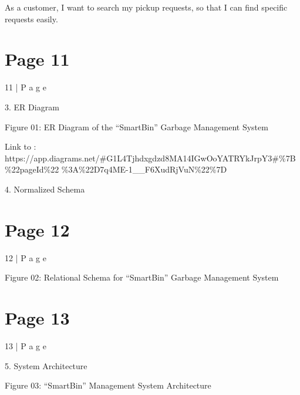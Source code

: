 \documentclass{article}
\begin{document}
As a customer, I want to search my pickup requests, so that I can 
find specific requests easily.  
 
 
 
 
 
 
 
 
 
 
 
 
 
 
 
 
 
 
 
 
 

\section*{Page 11}
11 | P a g e 
 
3. ER Diagram 
 
  Figure 01: ER Diagram of the “SmartBin” Garbage Management System 
 
 
 
Link to : 
https://app.diagrams.net/\#G1L4Tjhdxgdzd8MA14IGwOoYATRYkJrpY3\#\%7B\%22pageId\%22
\%3A\%22D7q4ME-1\_\_F6XudRjVuN\%22\%7D 
 
 
 
 
4. Normalized Schema 
 
 


\section*{Page 12}
12 | P a g e 
 
 
 
 
 
 
 
 
 
 
 
 
 
 
 
 
 
 
 
 
 
 
 
 
 
  Figure 02: Relational Schema for “SmartBin” Garbage Management System 
 


\section*{Page 13}
13 | P a g e 
 
 
5. System Architecture 
 
Figure 03: “SmartBin” Management System Architecture 
 
\end{document}
